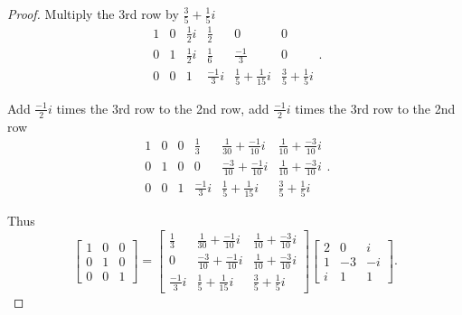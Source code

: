 \begin{proof}
    Multiply the 3rd row by $\frac{3}{5} + \frac{1}{5}i$
    \[
        \begin{array}{ccc|ccc}
            1 & 0 & \frac{1}{2}i & \frac{1}{2}   & 0                           & 0                          \\
            0 & 1 & \frac{1}{2}i & \frac{1}{6}   & \frac{-1}{3}                & 0                          \\
            0 & 0 & 1            & \frac{-1}{3}i & \frac{1}{5} + \frac{1}{15}i & \frac{3}{5} + \frac{1}{5}i
        \end{array}.
    \]

    Add $\frac{-1}{2}i$ times the 3rd row to the 2nd row, add $\frac{-1}{2}i$ times the 3rd row to the 2nd row
    \[
        \begin{array}{ccc|ccc}
            1 & 0 & 0 & \frac{1}{3}   & \frac{1}{30} + \frac{-1}{10}i  & \frac{1}{10} + \frac{-3}{10}i \\
            0 & 1 & 0 & 0             & \frac{-3}{10} + \frac{-1}{10}i & \frac{1}{10} + \frac{-3}{10}i \\
            0 & 0 & 1 & \frac{-1}{3}i & \frac{1}{5} + \frac{1}{15}i    & \frac{3}{5} + \frac{1}{5}i
        \end{array}.
    \]

    Thus
    \[
        \begin{bmatrix}
            1 & 0 & 0 \\
            0 & 1 & 0 \\
            0 & 0 & 1
        \end{bmatrix}
        =
        \begin{bmatrix}
            \frac{1}{3}   & \frac{1}{30} + \frac{-1}{10}i  & \frac{1}{10} + \frac{-3}{10}i \\
            0             & \frac{-3}{10} + \frac{-1}{10}i & \frac{1}{10} + \frac{-3}{10}i \\
            \frac{-1}{3}i & \frac{1}{5} + \frac{1}{15}i    & \frac{3}{5} + \frac{1}{5}i
        \end{bmatrix}
        \begin{bmatrix}
            2 & 0  & i  \\
            1 & -3 & -i \\
            i & 1  & 1
        \end{bmatrix}.
    \]
\end{proof}

